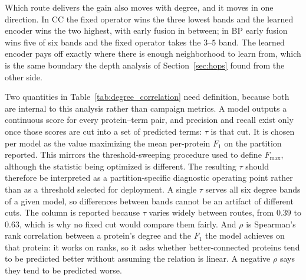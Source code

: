 \documentclass[Ingles]{ic-tese-v3}
\begin{document}
Which route delivers the gain also moves with degree, and it moves in one direction. In CC
the fixed operator wins the three lowest bands and the learned encoder wins the two highest,
with early fusion in between; in BP early fusion wins five of six bands and the fixed
operator takes the $3$--$5$ band. The learned encoder pays off exactly where there is enough
neighborhood to learn from, which is the same boundary the depth analysis of
Section~\ref{sec:hops} found from the other side.

Two quantities in Table~\ref{tab:degree_correlation} need definition, because both are
internal to this analysis rather than campaign metrics. A model outputs a continuous score
for every protein--term pair, and precision and recall exist only once those scores are cut
into a set of predicted terms: $\tau$ is that cut. It is chosen per model as the value maximizing the mean per-protein $F_1$ on the partition reported. This mirrors the threshold-sweeping procedure used to define $F_{\max}$, although the statistic being optimized is different. The resulting $\tau$ should therefore be interpreted as a partition-specific diagnostic operating point rather than as a threshold selected for deployment. A single $\tau$ serves
all six degree bands of a given model, so differences between bands cannot be an artifact of
different cuts. The column is reported because $\tau$ varies widely between routes, from
$0.39$ to $0.63$, which is why no fixed cut would compare them fairly. And $\rho$ is
Spearman's rank correlation between a protein's degree and the $F_1$ the model achieves on
that protein: it works on ranks, so it asks whether better-connected proteins tend to be
predicted better without assuming the relation is linear. A negative $\rho$ says they tend
to be predicted worse.
\end{document}
